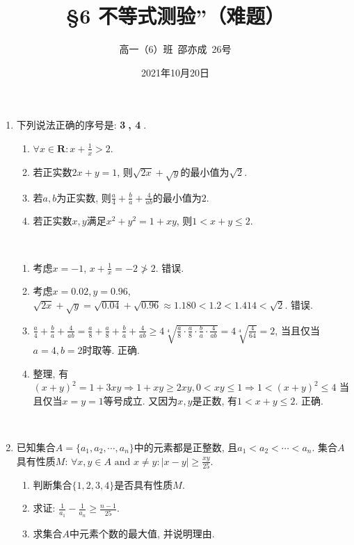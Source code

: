 \documentclass[8pt]{article}
\author{高一（6）班\ 邵亦成\ 26号}
\title{\S 6 不等式测验''（难题）}
\date{2021年10月20日}
\begin{document}
	\maketitle

	\begin{enumerate}[label=(\arabic*)]
		\item 下列说法正确的序号是: \textbf{\textcircled{3}, \textcircled{4}}.
			\begin{enumerate}[label=\textcircled{\arabic*}]
				\item $\displaystyle \forall x\in\mathbf{R}: x+\frac{1}{x}>2.$
				\item 若正实数$2x+y=1$, 则$\sqrt{2x}+\sqrt{y}$的最小值为$\sqrt{2}.$
				\item 若$a, b$为正实数, 则$\displaystyle \frac{a}{4}+\frac{b}{a}+\frac{4}{ab}$的最小值为$2$.
				\item 若正实数$x, y$满足$x^2+y^2=1+xy$, 则$1<x+y\leq 2.$
			\end{enumerate}
			~\\

			\begin{enumerate}[label=\textcircled{\arabic*}]
				\item 考虑$x=-1$, $x+\frac{1}{x}=-2\ngtr 2$. 错误.

				\item 考虑$x=0.02, y=0.96$, $\sqrt{2x}+\sqrt{y}=\sqrt{0.04}+\sqrt{0.96}\approx 1.180 < 1.2 < 1.414 < \sqrt{2}.$ 错误.

				\item $\displaystyle \frac{a}{4}+\frac{b}{a}+\frac{4}{ab}=\frac{a}{8}+\frac{a}{8}+\frac{b}{a}+\frac{4}{ab}\geq 4\sqrt[4]{\frac{a}{8}\cdot\frac{a}{8}\cdot\frac{b}{a}\cdot\frac{4}{ab}}=4\sqrt[4]{\frac{4}{64}}=2$, 当且仅当$a=4, b=2$时取等. 正确.

				\item 整理, 有$(x+y)^2=1+3xy\Rightarrow 1+xy\geq 2xy, 0<xy\leq 1 \Rightarrow 1<(x+y)^2\leq 4$ 当且仅当$x=y=1$等号成立. 又因为$x, y$是正数, 有$1< x+y \leq 2$. 正确.
			\end{enumerate}

		~\\

		\item 已知集合$A=\{a_1, a_2, \cdots, a_n\}$中的元素都是正整数, 且$a_1<a_2<\cdots<a_n.$ 集合$A$具有性质$M$: $\displaystyle \forall x, y\in A \text{ and } x\neq y: |x-y|\geq \frac{xy}{25}.$

			\begin{enumerate}[label=(\arabic*)]
				\item 判断集合$\{1,2,3,4\}$是否具有性质$M$.
				\item 求证: $\displaystyle \frac{1}{a_1}-\frac{1}{a_n}\geq\frac{n-1}{25}.$
				\item 求集合$A$中元素个数的最大值, 并说明理由.
			\end{enumerate}
			~\\


\end{enumerate}
\end{document}
